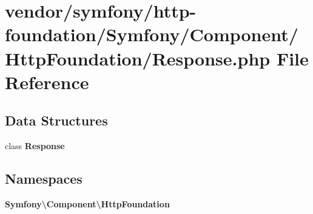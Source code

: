 \section{vendor/symfony/http-\/foundation/\+Symfony/\+Component/\+Http\+Foundation/\+Response.php File Reference}
\label{symfony_2http-foundation_2_symfony_2_component_2_http_foundation_2_response_8php}
\subsection*{Data Structures}
\begin{DoxyCompactItemize}
\item 
class {\bf Response}
\end{DoxyCompactItemize}
\subsection*{Namespaces}
\begin{DoxyCompactItemize}
\item 
 {\bf Symfony\textbackslash{}\+Component\textbackslash{}\+Http\+Foundation}
\end{DoxyCompactItemize}
